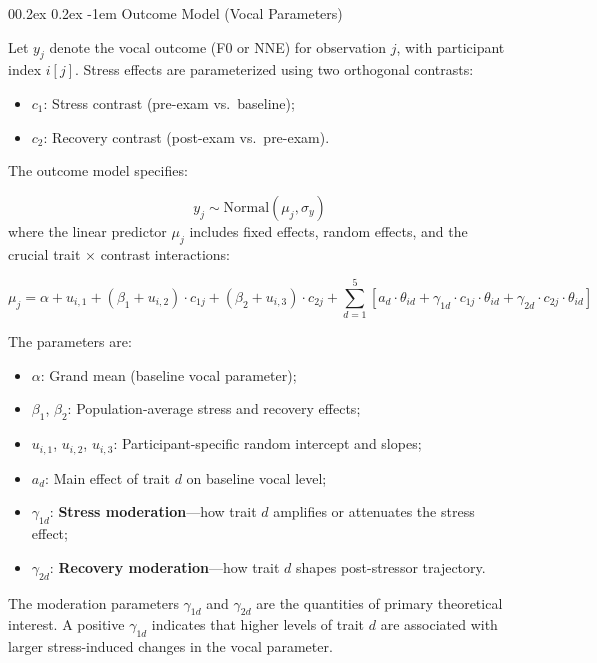 \documentclass[
  english,
  man,floatsintext]{apa6}
\makeatletter
\let\oldparagraph\paragraph
\renewcommand{\paragraph}{
    \@ifstar
      \xxxParagraphStar
      \xxxParagraphNoStar
  }
\newcommand{\xxxParagraphStar}[1]{\oldparagraph*{#1}\mbox{}}
\newcommand{\xxxParagraphNoStar}[1]{\oldparagraph{#1}\mbox{}}
\providecommand{\tightlist}{%
  \setlength{\itemsep}{0pt}\setlength{\parskip}{0pt}}
\renewcommand{\paragraph}{\@startsection{paragraph}{4}{\parindent}%
  {0\baselineskip \@plus 0.2ex \@minus 0.2ex}%
  {-1em}%
  {\normalfont\normalsize\bfseries\itshape\typesectitle}}
\makeatother
\begin{document}
\paragraph{Outcome Model (Vocal Parameters)}\label{outcome-model-vocal-parameters}

Let \(y_j\) denote the vocal outcome (F0 or NNE) for observation \(j\), with participant index \(i[j]\). Stress effects are parameterized using two orthogonal contrasts:

\begin{itemize}
\tightlist
\item
  \(c_1\): Stress contrast (pre-exam vs.~baseline);
\item
  \(c_2\): Recovery contrast (post-exam vs.~pre-exam).
\end{itemize}

The outcome model specifies:

\[
y_j \sim \text{Normal}(\mu_j, \sigma_y)
\]
where the linear predictor \(\mu_j\) includes fixed effects, random effects, and the crucial trait × contrast interactions:

\[
\mu_j = \alpha + u_{i,1} + (\beta_1 + u_{i,2}) \cdot c_{1j} + (\beta_2 + u_{i,3}) \cdot c_{2j} + \sum_{d=1}^{5} \left[ a_d \cdot \theta_{id} + \gamma_{1d} \cdot c_{1j} \cdot \theta_{id} + \gamma_{2d} \cdot c_{2j} \cdot \theta_{id} \right]
\]

The parameters are:

\begin{itemize}
\tightlist
\item
  \(\alpha\): Grand mean (baseline vocal parameter);
\item
  \(\beta_1\), \(\beta_2\): Population-average stress and recovery effects;
\item
  \(u_{i,1}\), \(u_{i,2}\), \(u_{i,3}\): Participant-specific random intercept and slopes;
\item
  \(a_d\): Main effect of trait \(d\) on baseline vocal level;
\item
  \(\gamma_{1d}\): \textbf{Stress moderation}---how trait \(d\) amplifies or attenuates the stress effect;
\item
  \(\gamma_{2d}\): \textbf{Recovery moderation}---how trait \(d\) shapes post-stressor trajectory.
\end{itemize}

The moderation parameters \(\gamma_{1d}\) and \(\gamma_{2d}\) are the quantities of primary theoretical interest. A positive \(\gamma_{1d}\) indicates that higher levels of trait \(d\) are associated with larger stress-induced changes in the vocal parameter.
\end{document}

